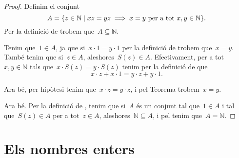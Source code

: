 \documentclass[../fonaments-de-les-matematiques.tex]{subfiles}
\begin{document}
    \begin{proof}
        Definim el conjunt
        \[
            A=\{z\in\mathbb{N}\mid xz=yz\implies x=y\text{ per a tot }x,y\in\mathbb{N}\}.
        \]
        Per la definició de  trobem que~\(A\subseteq\mathbb{N}\).

        Tenim que~\(1\in A\), ja que si~\(x\cdot1=y\cdot1\) per la definició de  trobem que~\(x=y\).
        També tenim que si~\(z\in A\), aleshores~\(S(z)\in A\).
        Efectivament, per a tot~\(x,y\in\mathbb{N}\) tals que~\(x\cdot S(z)=y\cdot S(z)\) tenim per la definició de  que
        \[
            x\cdot z+x\cdot1=y\cdot z+y\cdot1.
        \]

        Ara bé, per hipòtesi tenim que~\(x\cdot z=y\cdot z\), i pel Teorema  trobem~\(x=y\).

        Ara bé.
        Per la definició de , tenim que si~\(A\) és un conjunt tal que~\(1\in A\) i tal que~\(S(z)\in A\) per a tot~\(z\in A\), aleshores~\(\mathbb{N}\subseteq A\), i pel  tenim que~\(A=\mathbb{N}\).
    \end{proof}
\section{Els nombres enters}
\end{document}
